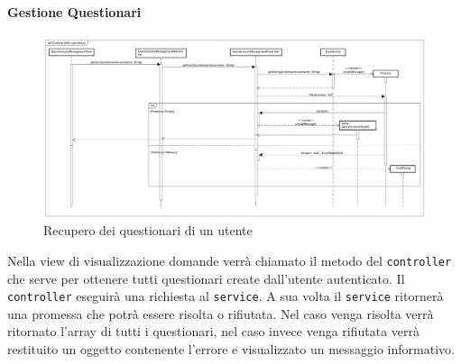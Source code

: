 \paragraph{Gestione Questionari}

\label{Recupero dei questionari di un utente}

\begin{figure}[ht]
	\centering
	\includegraphics[scale=0.25,keepaspectratio]{UML/DiagrammiDiSequenza/Front-end/QuestionnaireManagement.png}
	\caption{Recupero dei questionari di un utente}
\end{figure} \FloatBarrier

Nella view di visualizzazione domande verrà chiamato il metodo del \texttt{controller} che serve per ottenere tutti questionari create dall'utente autenticato. Il \texttt{controller} eseguirà una richiesta al \texttt{service}. A sua volta il \texttt{service} ritornerà una promessa che potrà essere risolta o rifiutata. Nel caso venga risolta verrà ritornato l'array di tutti i questionari, nel caso invece venga rifiutata verrà restituito un oggetto contenente l'errore e visualizzato un messaggio informativo. 